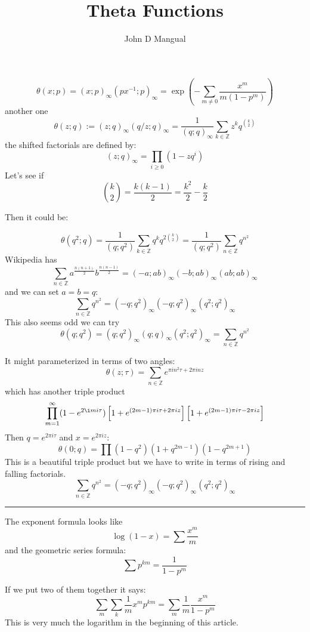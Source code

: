 \documentclass[12pt]{article}
\title{\textbf{ Theta Functions }}
\author{John D Mangual}
\date{}
\begin{document}
\selectfont \fontsize{25}{30}\selectfont

\maketitle

$$\theta(x; p) = (x;p)_\infty (px^{-1}; p)_\infty = \exp \left( - \sum_{ m \neq 0} \frac{x^m}{m(1-p^m)} \right) $$
another one
$$\theta(z; q) := (z;q)_\infty (q/z ;q)_\infty = \frac{1}{(q;q)_\infty} \sum_{k \in \mathbb{Z}} z^k q^{\binom{k}{2}}  $$
the shifted factorials are defined by:
$$ (z;q)_\infty = \prod_{i \geq 0} (1 - z q^i)$$
Let's see if
$$ \binom{k}{2} = \frac{k(k-1)}{2} = \frac{k^2}{2} - \frac{k}{2}$$

\newpage

\noindent Then it could be:

$$ \theta( q^2 ; q) = \frac{1}{(q; q^2) }
\sum_{k \in \mathbb{Z}} q^k q^{2\binom{k}{2}}
 = \frac{1}{(q; q^2) }
\sum_{n \in \mathbb{Z}}  q^{n^2}
$$
Wikipedia has
$$ \sum_{n \in \mathbb{Z}}
a^{\frac{n(n+1)}{2}}
b^{\frac{n(n-1)}{2}}
= (-a; ab)_\infty (-b; ab)_\infty (ab; ab)_\infty
$$
and we can set $a = b = q$:
$$
\sum_{n \in \mathbb{Z}}
q^{n^2}
= (-q; q^2)_\infty (-q; q^2)_\infty (q^2; q^2)_\infty
 $$
 This also seems odd we can try
$$ \theta(q;q^2)
= (q;q^2)_\infty (q;q)_\infty (q^2; q^2)_\infty = \sum_{n \in \mathbb{Z}}q^{n^2}$$

\newpage 

\noindent It might parameterized in terms of two angles:
$$ \theta(z; \tau) = \sum_{n \in \mathbb{Z}} e^{\pi i n^2 \tau + 2\pi i n z}$$
which has another triple product
$$\prod_{m=1}^\infty
(1 - e^{2\i m i \tau})
\left[ 1 + e^{(2m-1)\pi i \tau + 2\pi i z} \right]
\left[ 1 + e^{(2m-1)\pi i \tau - 2\pi i z} \right]$$
Then $q = e^{2\pi i \tau}$ and $x = e^{2\pi i z}$:
$$\theta( 0; q) =  \prod (1 - q^2 )(1 + q^{2m-1})(1 - q^{2m+1}) $$
This is a beautiful triple product but we have to write in terms of rising and falling factorials.
$$
\sum_{n \in \mathbb{Z}}
q^{n^2}
= (-q; q^2)_\infty (-q; q^2)_\infty (q^2; q^2)_\infty
 $$
 \hrule
\vspace{12pt}
\noindent The exponent formula looks like
$$ \log(1-x) = \sum \frac{x^m}{m} $$
and the geometric series formula:
$$ \sum p^{km} = \frac{1}{1-p^m}$$
\newpage

\noindent If we put two of them together it says:
$$ \sum_m \sum_k \frac{1}{m}x^m p^{km} = \sum_m \frac{1}{m} \frac{x^m }{1 - p^m} $$
This is very much the logarithm in the beginning of this article. \newpage
\end{document}
